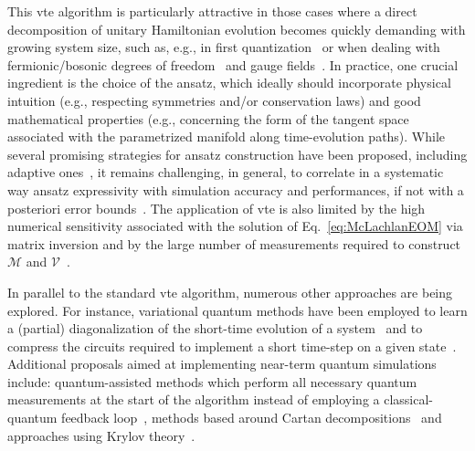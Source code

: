 This \gls{vte} algorithm is particularly attractive in those cases where a direct decomposition of unitary Hamiltonian evolution becomes quickly demanding with growing system size, such as, e.g., in first quantization~\cite{ollitrault2022quantum} or when dealing with fermionic/bosonic degrees of freedom~\cite{macridin2018,endo_calculation_2020,miessen2021quantum,LibbiGreen2022} and gauge fields~\cite{Mathis2020, Mazzola2021}. 
In practice, one crucial ingredient is the choice of the ansatz, which ideally should incorporate physical intuition (e.g., respecting symmetries and/or conservation laws) and good mathematical properties (e.g., concerning the form of the tangent space associated with the parametrized manifold along time-evolution paths). While several promising strategies for ansatz construction have been proposed, including adaptive 
ones~\cite{gomes2023computing}, it remains challenging, in general, to correlate in a systematic way ansatz expressivity with simulation accuracy and performances, if not with a posteriori error bounds~\cite{zoufal2021error}. The application of \gls{vte} is also limited by the high numerical sensitivity associated with the solution of Eq.~\eqref{eq:McLachlanEOM} via matrix inversion and by the large number of measurements required to construct $\mathcal{M}$ and $\bm{\mathcal{V}}$~\cite{miessen2021quantum, zoufal2021error}. 

In parallel to the standard \gls{vte} algorithm, numerous other approaches are being explored. For instance, variational quantum methods have been employed to learn a (partial) diagonalization of the short-time evolution of a system~\cite{heya2019subspace, cirstoiu2020variational, gibbs2021long, gibbs2022dynamical} and to compress the circuits required to implement a short time-step on a given state~\cite{otten2019noise, Lin2021Real, barison2021efficient, benedetti2020hardware}. Additional proposals aimed at implementing near-term quantum simulations include: quantum-assisted methods which perform all necessary quantum measurements at the start of the algorithm instead of employing a classical-quantum feedback loop~\cite{bharti2020quantum,lau2021quantum,haug2020generalized}, methods based around Cartan decompositions~\cite{Kokcu2022Fixed, steckmann2021simulating} and approaches using Krylov theory~\cite{jamet2021krylov}.  

